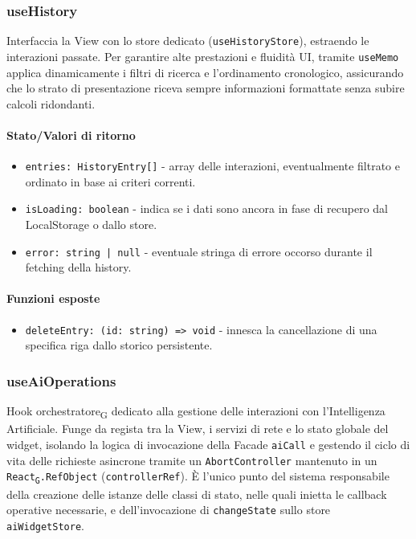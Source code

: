 \documentclass[11pt,a4paper]{article}
\newcommand{\gls}[1]{#1\textsubscript{G}}
\begin{document}
\subsubsection{useHistory}
Interfaccia la View con lo store dedicato (\texttt{useHistoryStore}), estraendo le interazioni passate. Per garantire alte prestazioni e fluidità UI, tramite \texttt{useMemo} applica dinamicamente i filtri di ricerca e l'ordinamento cronologico, assicurando che lo strato di presentazione riceva sempre informazioni formattate senza subire calcoli ridondanti.


\paragraph{Stato/Valori di ritorno}
\begin{itemize}
    \item \texttt{entries: HistoryEntry[]} - array delle interazioni, eventualmente filtrato e ordinato in base ai criteri correnti.
    \item \texttt{isLoading: boolean} - indica se i dati sono ancora in fase di recupero dal LocalStorage o dallo store.
    \item \texttt{error: string | null} - eventuale stringa di errore occorso durante il fetching della history.
\end{itemize}

\paragraph{Funzioni esposte}
\begin{itemize}
    \item \texttt{deleteEntry: (id: string) => void} - innesca la cancellazione di una specifica riga dallo storico persistente.
\end{itemize}


\subsubsection{useAiOperations}
Hook \gls{orchestratore} dedicato alla gestione delle interazioni con l'Intelligenza Artificiale. Funge da regista tra la View, i servizi di rete e lo stato globale del widget, isolando la logica di invocazione della Facade \texttt{aiCall} e gestendo il ciclo di vita delle richieste asincrone tramite un \texttt{AbortController} mantenuto in un \texttt{\gls{React}.RefObject} (\texttt{controllerRef}). È l'unico punto del sistema responsabile della creazione delle istanze delle classi di stato, nelle quali inietta le callback operative necessarie, e dell'invocazione di \texttt{changeState} sullo store \texttt{aiWidgetStore}.
\end{document}

